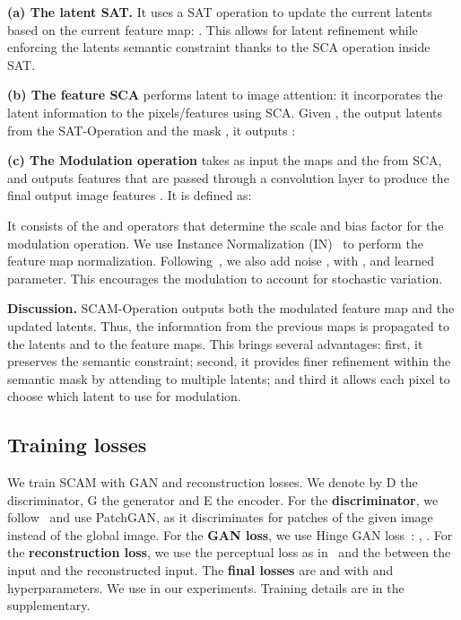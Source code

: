 \documentclass[runningheads]{llncs}
\makeatletter
\newcommand{\mname}{SCAM\@\xspace}
\makeatother
\begin{document}
\noindent \textbf{(a) The latent SAT.} It uses a SAT operation to update the current latents    based on the current feature map: 
. 
This allows for latent refinement while enforcing the latents semantic constraint thanks to the SCA operation inside SAT.

\noindent \textbf{(b) The feature SCA} performs latent to image attention: it incorporates the latent information to the pixels/features  using SCA. Given , the output latents from the SAT-Operation  and the mask , it outputs  :


\noindent \textbf{(c) The Modulation operation} takes as input the  maps and the   from SCA, and outputs features that are passed through a convolution layer  to produce the final output image features .  It is defined as:

It consists of the  and  operators that determine the scale and bias factor for the modulation operation. 
We use Instance Normalization (IN)~\cite{ulyanov2017instance} to perform the feature map normalization. 
Following~\cite{karras2019stylebased,karras2020analyzing}, we also add noise , with , and  learned parameter. This encourages the modulation to account for stochastic variation.



\noindent \textbf{Discussion.} SCAM-Operation outputs both the modulated feature map and the updated latents. Thus, the information from the previous maps is propagated to the latents and to the feature maps. This brings several advantages: 
first, it preserves the semantic constraint; 
second, it provides finer refinement within the semantic mask by attending to multiple latents; and 
third it allows each pixel to choose which latent to use for modulation.



 
\subsection{Training losses}
We train \mname with GAN and reconstruction losses. We denote by D the discriminator, G the generator and E the encoder.
For the \textbf{ discriminator}, we follow~\cite{isola2018imagetoimage,wang2018pix2pixHD,wang2018pix2pixHD,park2019semantic} and use PatchGAN, as it discriminates for patches of the given image instead of the global image. 
For the \textbf{GAN loss}, we use Hinge GAN loss~\cite{lim2017geometric}: , . 
For the \textbf{reconstruction loss}, we use the perceptual loss  as in~\cite{Zhu_2020} and the   between the input and the reconstructed input. 
The \textbf{final losses} are  and  with  and  hyperparameters. 
We use  in our experiments. Training details are in the supplementary.
\end{document}
